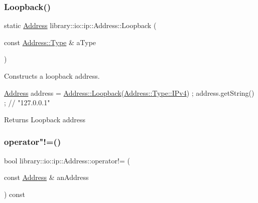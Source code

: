 \subsubsection{\texorpdfstring{Loopback()}{Loopback()}}
{\footnotesize\ttfamily static \hyperlink{classlibrary_1_1io_1_1ip_1_1_address}{Address} library\+::io\+::ip\+::\+Address\+::\+Loopback (\begin{DoxyParamCaption}\item[{const \hyperlink{classlibrary_1_1io_1_1ip_1_1_address_a1a4f284eb6f5f52b67f2e34a93f225af}{Address\+::\+Type} \&}]{a\+Type }\end{DoxyParamCaption})\hspace{0.3cm}{\ttfamily [static]}}



Constructs a loopback address. 


\begin{DoxyCode}
\hyperlink{classlibrary_1_1io_1_1ip_1_1_address_ab968d468b8bc2ba8f48fd2b6784832fe}{Address} address = \hyperlink{classlibrary_1_1io_1_1ip_1_1_address_a79cb92d3917c101f3908ce6f251fffd7}{Address::Loopback}(\hyperlink{classlibrary_1_1io_1_1ip_1_1_address_a1a4f284eb6f5f52b67f2e34a93f225afa42a9137a05a60eb752dcdf982e717626}{Address::Type::IPv4}) ;
address.getString() ; \textcolor{comment}{// "127.0.0.1"}
\end{DoxyCode}


\begin{DoxyReturn}{Returns}
Loopback address 
\end{DoxyReturn}
\mbox{\label{classlibrary_1_1io_1_1ip_1_1_address_a56dec93d614ec71b02d57377fe687029}} 
\subsubsection{\texorpdfstring{operator"!=()}{operator!=()}}
{\footnotesize\ttfamily bool library\+::io\+::ip\+::\+Address\+::operator!= (\begin{DoxyParamCaption}\item[{const \hyperlink{classlibrary_1_1io_1_1ip_1_1_address}{Address} \&}]{an\+Address }\end{DoxyParamCaption}) const}



